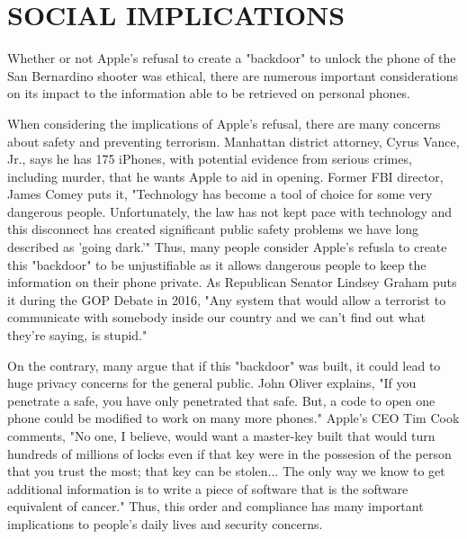 \section{SOCIAL IMPLICATIONS}
Whether or not Apple's refusal to create a "backdoor" to unlock the phone of the San Bernardino shooter was ethical, there are numerous important considerations on its impact to the information able to be retrieved on personal phones.\par

When considering the implications of Apple's refusal, there are many concerns about safety and preventing terrorism. Manhattan district attorney, Cyrus Vance, Jr., says he has 175 iPhones, with potential evidence from serious crimes, including murder, that he wants Apple to aid in opening.\cite{Manhattan-da} Former FBI director, James Comey puts it, "Technology has become a tool of choice for some very dangerous people. Unfortunately, the law has not kept pace with technology and this disconnect has created significant public safety problems we have long described as 'going dark.'"\cite{brookings} Thus, many people consider Apple's refusla to create this "backdoor" to be unjustifiable as it allows dangerous people to keep the information on their phone private. As Republican Senator Lindsey Graham puts it during the GOP Debate in 2016, "Any system that would allow a terrorist to communicate with somebody inside our country and we can't find out what they're saying, is stupid."\cite{CNN-GOP-Debate}\par

On the contrary, many argue that if this "backdoor" was built, it could lead to huge privacy concerns for the general public. John Oliver explains, "If you penetrate a safe, you have only penetrated that safe. But, a code to open one phone could be modified to work on many more phones."\cite{John-Oliver} Apple's CEO Tim Cook comments, "No one, I believe, would want a master-key built that would turn hundreds of millions of locks even if that key were in the possesion of the person that you trust the most; that key can be stolen... The only way we know to get additional information is to write a piece of software that is the software equivalent of cancer."\cite{ABC-TimCook} Thus, this order and compliance has many important implications to people's daily lives and security concerns. 